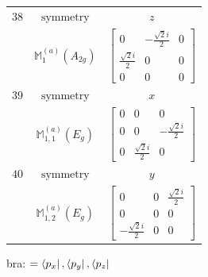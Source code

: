 \documentclass[fleqn,8pt,landscape]{jsarticle}
\begin{document}
\begin{longtable}{ccc}
$ 38 $ & $ \text{symmetry} $ & $ z $ \\
$  $ & $ \mathbb{M}_{1}^{(a)}(A_{2g}) $ & $ \begin{bmatrix} 0 & - \frac{\sqrt{2} i}{2} & 0 \\ \frac{\sqrt{2} i}{2} & 0 & 0 \\ 0 & 0 & 0 \end{bmatrix} $ \\ \hline
$ 39 $ & $ \text{symmetry} $ & $ x $ \\
$  $ & $ \mathbb{M}_{1,1}^{(a)}(E_{g}) $ & $ \begin{bmatrix} 0 & 0 & 0 \\ 0 & 0 & - \frac{\sqrt{2} i}{2} \\ 0 & \frac{\sqrt{2} i}{2} & 0 \end{bmatrix} $ \\ \hline
$ 40 $ & $ \text{symmetry} $ & $ y $ \\
$  $ & $ \mathbb{M}_{1,2}^{(a)}(E_{g}) $ & $ \begin{bmatrix} 0 & 0 & \frac{\sqrt{2} i}{2} \\ 0 & 0 & 0 \\ - \frac{\sqrt{2} i}{2} & 0 & 0 \end{bmatrix} $ \\ \hline
\end{longtable}
bra: $=\bra{p_{x}}, \bra{p_{y}}, \bra{p_{z}}$
\end{document}
